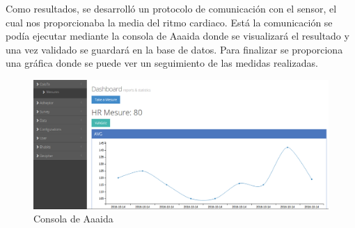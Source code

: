 Como resultados, se desarrolló un protocolo de comunicación con el sensor, el cual nos proporcionaba la media  del ritmo cardiaco. Está la comunicación se podía ejecutar mediante la consola de Aaaida donde se visualizará el resultado y una vez validado se guardará en la base de datos. Para finalizar se proporciona una gráfica donde se puede ver un seguimiento de las medidas realizadas. 

\begin{figure}[htb]
\begin{center}
\includegraphics[width=1\textwidth]{./setup/final}
\caption{Consola de Aaaida}
\end{center}
\end{figure}
\pagebreak


